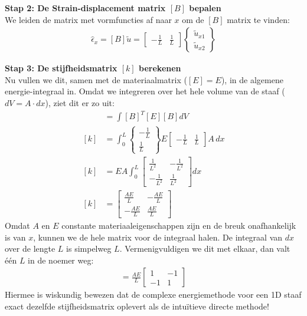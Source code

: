 \documentclass[a4paper,11pt,twoside]{report}
\begin{document}
\textbf{Stap 2: De Strain-displacement matrix $[B]$ bepalen} \\
We leiden de matrix met vormfuncties af naar $x$ om de $[B]$ matrix te vinden:
\begin{align*}
    \hat{\epsilon}_x = [B]\tilde{u} = \begin{bmatrix} -\frac{1}{L} & \frac{1}{L} \end{bmatrix} \begin{Bmatrix} \tilde{u}_{x1} \\ \tilde{u}_{x2} \end{Bmatrix}
\end{align*}

\textbf{Stap 3: De stijfheidsmatrix $[k]$ berekenen} \\
Nu vullen we dit, samen met de materiaalmatrix ($[E] = E$), in de algemene energie-integraal in.
Omdat we integreren over het hele volume van de staaf ($dV = A \cdot dx$), ziet dit er zo uit:
\begin{align*}
    [k] & = \int [B]^T [E] [B] dV                                                                                                                 \\
    [k] & = \int_0^L \begin{Bmatrix} -\frac{1}{L} \\ \frac{1}{L} \end{Bmatrix} E \begin{bmatrix} -\frac{1}{L} & \frac{1}{L} \end{bmatrix} A \, dx \\
    [k] & = EA \int_0^L \begin{bmatrix} \frac{1}{L^2} & -\frac{1}{L^2} \\ -\frac{1}{L^2} & \frac{1}{L^2} \end{bmatrix} dx                         \\
    [k] & = \begin{bmatrix} \frac{AE}{L} & -\frac{AE}{L} \\ -\frac{AE}{L} & \frac{AE}{L} \end{bmatrix}
\end{align*}
Omdat $A$ en $E$ constante materiaaleigenschappen zijn en de breuk onafhankelijk is van $x$, kunnen
we de hele matrix voor de integraal halen. De integraal van $dx$ over de lengte $L$ is simpelweg
$L$. Vermenigvuldigen we dit met elkaar, dan valt één $L$ in de noemer weg:
\begin{align*}
    [k] = \frac{AE}{L} \begin{bmatrix} 1 & -1 \\ -1 & 1 \end{bmatrix}
\end{align*}
Hiermee is wiskundig bewezen dat de complexe energiemethode voor een 1D staaf exact dezelfde
stijfheidsmatrix oplevert als de intuïtieve directe methode!
\end{document}
